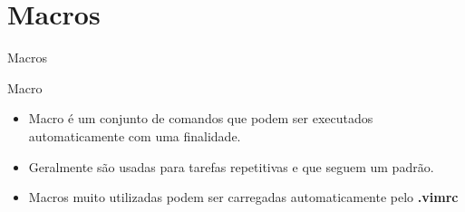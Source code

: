 \section{Macros}
\begin{frame}{Macros}
	\begin{block}{Macro}
	\begin{itemize}
		\item Macro é um conjunto de comandos que podem ser executados automaticamente com uma finalidade.
		\item Geralmente são usadas para tarefas repetitivas e que seguem um padrão.
		\item Macros muito utilizadas podem ser carregadas automaticamente pelo \textbf{.vimrc}
	\end{itemize}
	\end{block}
\end{frame}

